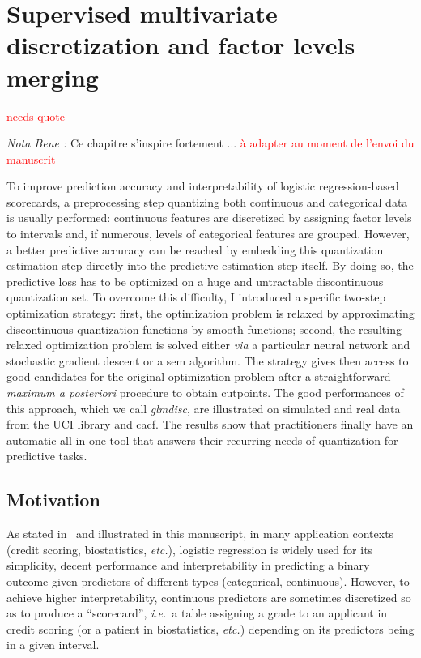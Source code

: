 \chapter{Supervised multivariate discretization and factor levels merging} \label{chap4}

\textcolor{red}{needs quote}

\textit{Nota Bene :} Ce chapitre s'inspire fortement ... \textcolor{red}{à adapter au moment de l'envoi du manuscrit}


To improve prediction accuracy and interpretability of logistic regression-based scorecards, a preprocessing step quantizing both continuous and categorical data is usually performed: continuous features are discretized by assigning factor levels to intervals and, if numerous, levels of categorical features are grouped. However, a better predictive accuracy can be reached by embedding this quantization estimation step directly into the predictive estimation step itself. By doing so, the predictive loss has to be optimized on a huge and untractable discontinuous quantization set. To overcome this difficulty, I introduced a specific two-step optimization strategy: first, the optimization problem is relaxed by approximating discontinuous quantization functions by smooth functions; second, the resulting relaxed optimization problem is solved either \textit{via} a particular neural network and stochastic gradient descent or a \gls{sem} algorithm. The strategy gives then access to good candidates for the original optimization problem after a straightforward \textit{maximum a posteriori} procedure to obtain cutpoints. The good performances of this approach, which we call \textit{glmdisc}, are illustrated on simulated and real data from the UCI library and \gls{cacf}. The results show that practitioners finally have an automatic all-in-one tool that answers their recurring needs of quantization for predictive tasks.
 
\section{Motivation}

As stated in~\cite{hosmer2013applied} and illustrated in this manuscript, in many application contexts (credit scoring, biostatistics, {\it etc.}), logistic regression is widely used for its simplicity, decent performance and interpretability in predicting a binary outcome given predictors of different types (categorical, continuous). However, to achieve  higher interpretability, continuous predictors are sometimes discretized so as to produce a ``scorecard'', \textit{i.e.}\ a table assigning a grade to an applicant in credit scoring (or a patient in biostatistics, {\it etc.}) depending on its predictors being in a given interval.

